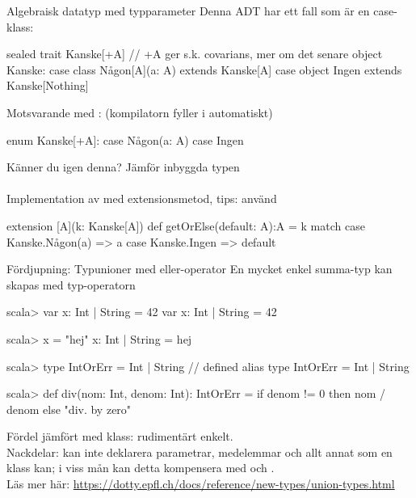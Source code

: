 \begin{Slide}{Algebraisk datatyp med typparameter}\SlideFontSmall
Denna ADT har ett fall som är en  case-klass:     
\begin{Code}
sealed trait Kanske[+A]   // +A ger s.k. covarians, mer om det senare
object Kanske:
  case class Någon[A](a: A) extends Kanske[A]
  case object Ingen extends Kanske[Nothing]   
\end{Code}
Motsvarande med : (kompilatorn fyller i  automatiskt)
\begin{Code}
enum Kanske[+A]:
  case Någon(a: A)
  case Ingen     
\end{Code}
Känner du igen denna? \pause Jämför inbyggda typen \\~\\Implementation av  med extensionsmetod, tips: använd  \pause
\begin{Code}
extension [A](k: Kanske[A]) def getOrElse(default: A):A = k match 
  case Kanske.Någon(a) => a
  case Kanske.Ingen => default
\end{Code}     
\end{Slide}

\begin{Slide}{Fördjupning: Typunioner med eller-operator}\SlideFontSmall
En mycket enkel summa-typ kan skapas med typ-operatorn \code{|} 
\begin{REPLsmall}
scala> var x: Int | String = 42
var x: Int | String = 42

scala> x = "hej" 
x: Int | String = hej

scala> type IntOrErr = Int | String
// defined alias type IntOrErr = Int | String

scala> def div(nom: Int, denom: Int): IntOrErr = 
         if denom != 0 then nom / denom else "div. by zero"
\end{REPLsmall}
Fördel jämfört med klass: rudimentärt enkelt.\\ Nackdelar: kan inte deklarera parametrar, medelemmar och allt annat som en klass kan; i viss mån kan detta kompensera med  och .\\ 
{\SlideFontTiny Läs mer här:
\url{https://dotty.epfl.ch/docs/reference/new-types/union-types.html}
}
\end{Slide}